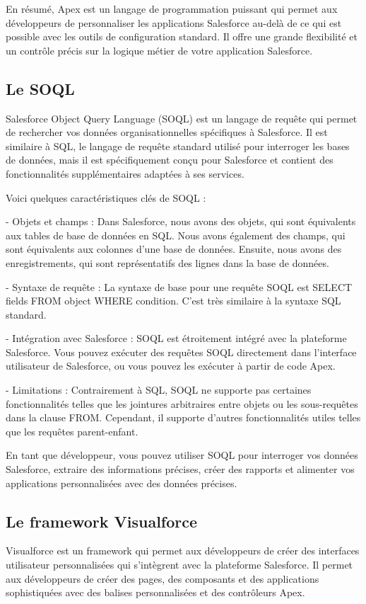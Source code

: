 \documentclass[12pt,oneside,noprintercorrection]{iut}
\begin{document}
En résumé, Apex est un langage de programmation puissant qui permet aux développeurs de personnaliser les applications Salesforce au-delà de ce qui est possible avec les outils de configuration standard. Il offre une grande flexibilité et un contrôle précis sur la logique métier de votre application Salesforce.

\subsection{Le SOQL}

Salesforce Object Query Language (SOQL) est un langage de requête qui permet de rechercher vos données organisationnelles spécifiques à Salesforce. Il est similaire à SQL, le langage de requête standard utilisé pour interroger les bases de données, mais il est spécifiquement conçu pour Salesforce et contient des fonctionnalités supplémentaires adaptées à ses services.

Voici quelques caractéristiques clés de SOQL :

- Objets et champs : Dans Salesforce, nous avons des objets, qui sont équivalents aux tables de base de données en SQL. Nous avons également des champs, qui sont équivalents aux colonnes d'une base de données. Ensuite, nous avons des enregistrements, qui sont représentatifs des lignes dans la base de données.

- Syntaxe de requête : La syntaxe de base pour une requête SOQL est SELECT {fields} FROM {object} WHERE {condition}. C'est très similaire à la syntaxe SQL standard.

- Intégration avec Salesforce : SOQL est étroitement intégré avec la plateforme Salesforce. Vous pouvez exécuter des requêtes SOQL directement dans l'interface utilisateur de Salesforce, ou vous pouvez les exécuter à partir de code Apex.

- Limitations : Contrairement à SQL, SOQL ne supporte pas certaines fonctionnalités telles que les jointures arbitraires entre objets ou les sous-requêtes dans la clause FROM. Cependant, il supporte d'autres fonctionnalités utiles telles que les requêtes parent-enfant.

En tant que développeur, vous pouvez utiliser SOQL pour interroger vos données Salesforce, extraire des informations précises, créer des rapports et alimenter vos applications personnalisées avec des données précises.
\clearpage

\subsection{Le framework Visualforce}
Visualforce est un framework qui permet aux développeurs de créer des interfaces utilisateur personnalisées qui s'intègrent avec la plateforme Salesforce. Il permet aux développeurs de créer des pages, des composants et des applications sophistiquées avec des balises personnalisées et des contrôleurs Apex.
\end{document}
